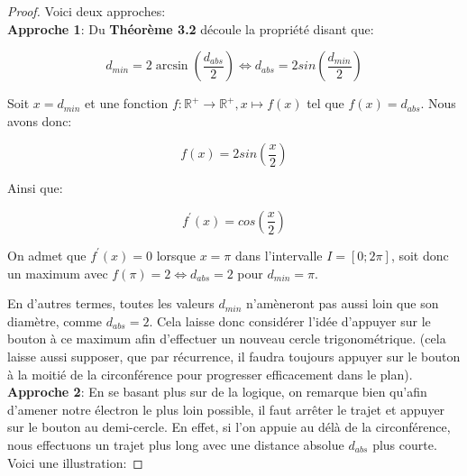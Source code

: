 \documentclass[a4paper]{amsart}
\theoremstyle{definition}
\theoremstyle{remark}
\numberwithin{equation}{section}
\begin{document}
\begin{proof}
  Voici deux approches:\\

  \textbf{Approche 1}: Du \textbf{Théorème 3.2} découle la propriété disant que:

  \[d_{min}=2\arcsin (\frac{d_{abs}}{2}) \Leftrightarrow d_{abs}=2sin(\frac{d_{min}}{2})\]

  Soit $x=d_{min}$ et une fonction $f:\mathbb{R^+}\longrightarrow \mathbb{R^+}, x\longmapsto f(x)$ tel que  $f(x)=d_{abs}$. Nous avons donc:

  \[f(x)=2sin(\frac{x}{2})\]

  Ainsi que:

  \[f^\prime(x)=cos(\frac{x}{2})\]

  On admet que $f^\prime(x)=0$ lorsque $x=\pi$ dans l'intervalle $I=[0;2\pi]$, soit donc un maximum avec $f(\pi)=2 \Leftrightarrow d_{abs}=2$ pour $d_{min}=\pi$.

  En d'autres termes, toutes les valeurs $d_{min}$ n'amèneront pas aussi loin que son diamètre, comme $d_{abs}=2$. Cela laisse donc considérer l'idée d'appuyer sur le bouton à ce maximum afin d'effectuer un nouveau cercle trigonométrique.
  (cela laisse aussi supposer, que par récurrence, il faudra toujours appuyer sur le bouton à la moitié de la circonférence pour progresser efficacement dans le plan).\\

  \textbf{Approche 2}: En se basant plus sur de la logique, on remarque bien qu'afin d'amener notre électron le plus loin possible, il faut arrêter le trajet et appuyer sur le bouton
  au demi-cercle. En effet, si l'on appuie au délà de la circonférence, nous effectuons un trajet plus long avec une distance absolue $d_{abs}$ plus courte. Voici une illustration:


\end{proof}
\end{document}
